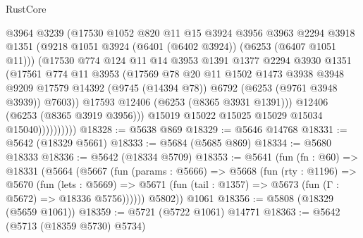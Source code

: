 \begin{lexlean}{RustCore}
\begin{coremodule}
                        @3964
                        @3239
                        (@17530
                          @1052
                          @820
                          @11
                          @15
                          @3924
                          @3956
                          @3963
                          @2294
                          @3918
                          @1351
                          (@9218 @1051 @3924 (@6401 (@6402 @3924)) (@6253 (@6407 @1051 @11)))
                          (@17530
                            @774
                            @124
                            @11
                            @14
                            @3953
                            @1391
                            @1377
                            @2294
                            @3930
                            @1351
                            (@17561
                              @774
                              @11
                              @3953
                              (@17569
                                @78
                                @20
                                @11
                                @1502
                                @1473
                                @3938
                                @3948
                                @9209
                                @17579
                                @14392
                                (@9745 (@14394 @78))
                                @6792
                                (@6253 (@9761 @3948 @3939))
                                @7603))
                            @17593
                            @12406
                            (@6253 (@8365 @3931 @1391)))
                          @12406
                          (@6253 (@8365 @3919 @3956)))
                        @15019
                        @15022
                        @15025
                        @15029
                        @15034
                        @15040))))))))))
@18328 := @5638 @869
@18329 := @5646 @14768
@18331 := @5642 (@18329 @5661)
@18333 := @5684 (@5685 @869)
@18334 := @5680 @18333
@18336 := @5642 (@18334 @5709)
@18353 := @5641
    (fun (fn : @60) =>
    @18331
      (@5664
        (@5667
          (fun (params : @5666) =>
          @5668
            (fun (rty : @1196) =>
            @5670
              (fun (lets : @5669) =>
              @5671 (fun (tail : @1357) => @5673 (fun (Γ : @5672) => @18336 @5756))))))
        @5802))
    @1061
@18356 := @5808 (@18329 (@5659 @1061))
@18359 := @5721 (@5722 @1061) @14771
@18363 := @5642 (@5713 (@18359 @5730) @5734)

\end{coremodule}
\end{lexlean}
